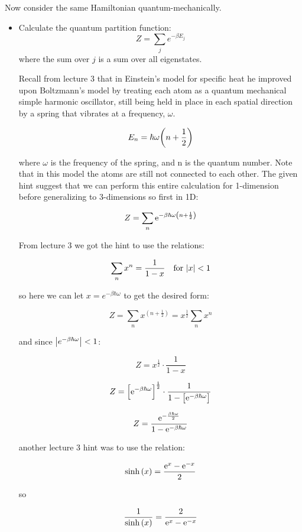 \begin{enumerate}[label=(\alph*)]
    Now consider the same Hamiltonian quantum-mechanically.
    \begin{itemize}
        \item Calculate the quantum partition function:
        \[
        Z = \sum_j e^{-\beta E_j}
        \]
        where the sum over $j$ is a sum over all eigenstates.
        
        \divider
        
        Recall from lecture 3 that in Einstein's model for specific heat he improved upon Boltzmann's model by treating each atom as a quantum mechanical simple harmonic oscillator, still being held in place in each spatial direction by a spring that vibrates at a frequency, $\omega$.

        \[ E_n = \hbar \omega \paren*{n + \frac{1}{2}}\]
    
        where $\omega$ is the frequency of the spring, and n is the quantum number. Note that in this model the atoms are still not connected to each other. The given hint suggest that we can perform this entire calculation for 1-dimension before generalizing to 3-dimensions so first in 1D:

        \[
        Z = \sum_n \e^{-\beta \hbar \omega \paren*{n + \frac{1}{2}}}
        \]

        From lecture 3 we got the hint to use the relations:

        \[ \sum_n x^n = \recip{1-x} \quad \text{for } \abs{x} < 1\]

        so here we can let $x = e^{- \beta \hbar \omega}$ to get the desired form:

        \[ Z = \sum_n x^{(n+ \frac{1}{2})} = x^{\frac{1}{2}} \sum_n x^n \]

        and since $\abs{e^{-\beta \hbar \omega}} < 1 $:

        \[ Z = x^{\frac{1}{2}} \cdot \frac{1}{1-x}\]

        \[ Z = \brackets*{\e^{- \beta \hbar \omega}}^{\frac{1}{2}} \cdot \frac{1}{1-\brackets*{\e^{- \beta \hbar \omega}}}\]

        \[ Z = \frac{\e^{- \frac{\beta \hbar \omega}{2}}}{1- \e^{-\beta \hbar \omega}}\]

        another lecture 3 hint was to use the relation:

        \[ \sinh{(x)} = \frac{\e^x - \e^{-x}}{2}\]

        so

        \[ \frac{1}{\sinh{(x)}} = \frac{2}{\e^x - \e^{-x}} \]


\end{itemize}
\end{enumerate}
